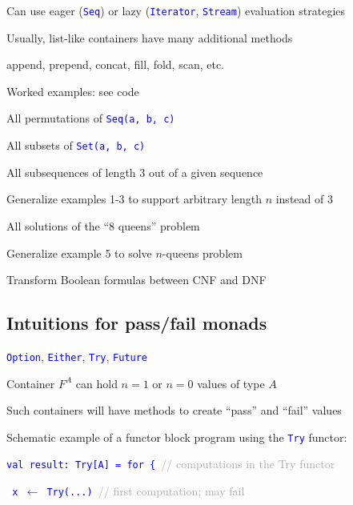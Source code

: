 Can use eager (\texttt{\textcolor{blue}{\footnotesize{}Seq}}) or lazy
(\texttt{\textcolor{blue}{\footnotesize{}Iterator}}, \texttt{\textcolor{blue}{\footnotesize{}Stream}})
evaluation strategies

Usually, list-like containers have many additional methods

append, prepend, concat, fill, fold, scan, etc.

Worked examples: see code

All permutations of \texttt{\textcolor{blue}{\footnotesize{}Seq(\textquotedbl a\textquotedbl ,
\textquotedbl b\textquotedbl , \textquotedbl c\textquotedbl )}} 

All subsets of \texttt{\textcolor{blue}{\footnotesize{}Set(\textquotedbl a\textquotedbl ,
\textquotedbl b\textquotedbl , \textquotedbl c\textquotedbl )}} 

All subsequences of length 3 out of a given sequence

Generalize examples 1-3 to support arbitrary length $n$ instead of
3

All solutions of the ``8 queens'' problem

Generalize example 5 to solve $n$-queens problem

Transform Boolean formulas between CNF and DNF 


\subsection{Intuitions for pass/fail monads}

\texttt{\textcolor{blue}{\footnotesize{}Option}}, \texttt{\textcolor{blue}{\footnotesize{}Either}},
\texttt{\textcolor{blue}{\footnotesize{}Try}}, \texttt{\textcolor{blue}{\footnotesize{}Future}}{\footnotesize\par}

Container $F^{A}$ can hold $n=1$ or $n=0$ values of type $A$

Such containers will have methods to create ``pass'' and ``fail''
values

Schematic example of a functor block program using the \texttt{\textcolor{blue}{\footnotesize{}Try}}
functor:

\texttt{\textcolor{blue}{\footnotesize{}val result: Try{[}A{]} = for
\{ }}\textcolor{darkgray}{\footnotesize{}// computations in the Try
functor}{\footnotesize\par}

\texttt{\textcolor{blue}{\footnotesize{}  x $\leftarrow$ Try(...)
}}\textcolor{darkgray}{\footnotesize{}// first computation; may fail}{\footnotesize\par}

